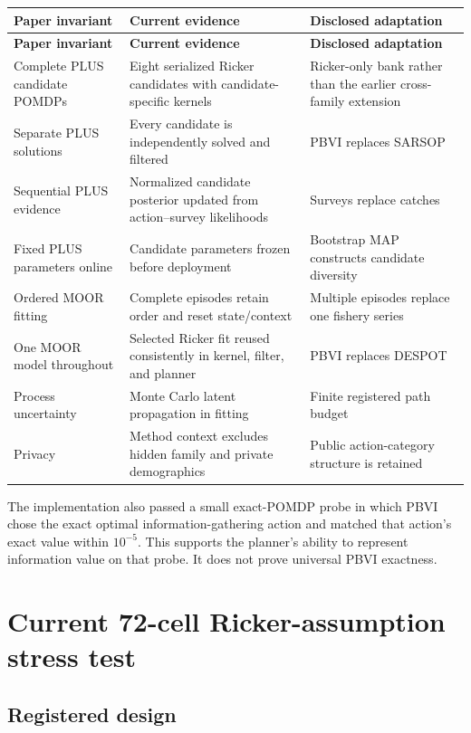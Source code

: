 \documentclass[11pt]{article}
\begin{document}
\begin{longtable}{L{0.29\textwidth}L{0.28\textwidth}L{0.33\textwidth}}
\toprule
\textbf{Paper invariant} & \textbf{Current evidence} & \textbf{Disclosed adaptation} \\
\midrule
\endfirsthead
\toprule
\textbf{Paper invariant} & \textbf{Current evidence} & \textbf{Disclosed adaptation} \\
\midrule
\endhead
Complete PLUS candidate POMDPs & Eight serialized Ricker candidates with candidate-specific kernels & Ricker-only bank rather than the earlier cross-family extension \\
Separate PLUS solutions & Every candidate is independently solved and filtered & PBVI replaces SARSOP \\
Sequential PLUS evidence & Normalized candidate posterior updated from action--survey likelihoods & Surveys replace catches \\
Fixed PLUS parameters online & Candidate parameters frozen before deployment & Bootstrap MAP constructs candidate diversity \\
Ordered MOOR fitting & Complete episodes retain order and reset state/context & Multiple episodes replace one fishery series \\
One MOOR model throughout & Selected Ricker fit reused consistently in kernel, filter, and planner & PBVI replaces DESPOT \\
Process uncertainty & Monte Carlo latent propagation in fitting & Finite registered path budget \\
Privacy & Method context excludes hidden family and private demographics & Public action-category structure is retained \\
\bottomrule
\end{longtable}

The implementation also passed a small exact-POMDP probe in which PBVI chose the exact optimal
information-gathering action and matched that action's exact value within $10^{-5}$. This supports
the planner's ability to represent information value on that probe. It does not prove universal
PBVI exactness.

\section{Current 72-cell Ricker-assumption stress test}

\subsection{Registered design}
\end{document}
